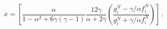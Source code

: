 \begin{equation}
\overline{x}=\left[\frac\alpha{1-\alpha^2+6\gamma (\gamma-1)}\frac{12\gamma}
{\alpha+2\gamma}\left(\frac{g^N_i-\gamma/\alpha f^N_i}{g^N_i+\gamma/\alpha 
f^N_i}\right)\right] \ .
\end{equation}

